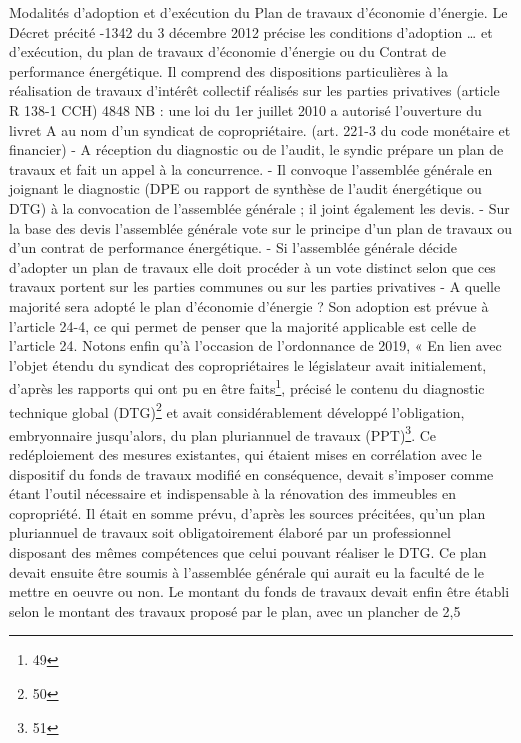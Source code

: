 		Modalités d’adoption et d’exécution du Plan de travaux d’économie d’énergie.
		Le Décret précité -1342 du 3 décembre 2012 précise les conditions d’adoption … et d’exécution, du plan de travaux d’économie d’énergie ou du Contrat de performance énergétique. Il comprend des dispositions particulières à la réalisation de travaux d’intérêt collectif réalisés sur les parties privatives (article R 138-1 CCH)
		4848 NB : une loi du 1er juillet 2010 a autorisé l’ouverture du livret A au nom d’un syndicat de copropriétaire. (art. 221-3 du code monétaire et financier)
		- A réception du diagnostic ou de l’audit, le syndic prépare un plan de travaux et fait un appel à la concurrence.
		- Il convoque l’assemblée générale en joignant le diagnostic (DPE ou rapport de synthèse de l’audit énergétique ou DTG) à la convocation de l’assemblée générale ; il joint également les devis.
		- Sur la base des devis l’assemblée générale vote sur le principe d’un plan de travaux ou d’un contrat de performance énergétique.
		- Si l’assemblée générale décide d’adopter un plan de travaux elle doit procéder à un vote distinct selon que ces travaux portent sur les parties communes ou sur les parties privatives
		- A quelle majorité sera adopté le plan d’économie d’énergie ? Son adoption est prévue à l’article 24-4, ce qui permet de penser que la majorité applicable est celle de l’article 24.
		Notons enfin qu’à l’occasion de l’ordonnance de 2019, « En lien avec l’objet étendu du syndicat des copropriétaires le législateur avait initialement, d’après les rapports qui ont pu en être faits\footnote{49}, précisé le contenu du diagnostic technique global (DTG)\footnote{50} et avait considérablement développé l’obligation, embryonnaire jusqu’alors, du plan pluriannuel de travaux (PPT)\footnote{51}.
		Ce redéploiement des mesures existantes, qui étaient mises en corrélation avec le dispositif du fonds de travaux modifié en conséquence, devait s’imposer comme étant l’outil nécessaire et indispensable à la rénovation des immeubles en copropriété. Il était en somme prévu, d’après les sources précitées, qu’un plan pluriannuel de travaux soit obligatoirement élaboré par un professionnel disposant des mêmes compétences que celui pouvant réaliser le DTG. Ce plan devait ensuite être soumis à l’assemblée générale qui aurait eu la faculté de le mettre en oeuvre ou non. Le montant du fonds de travaux devait enfin être établi selon le montant des travaux proposé par le plan, avec un plancher de 2,5%
